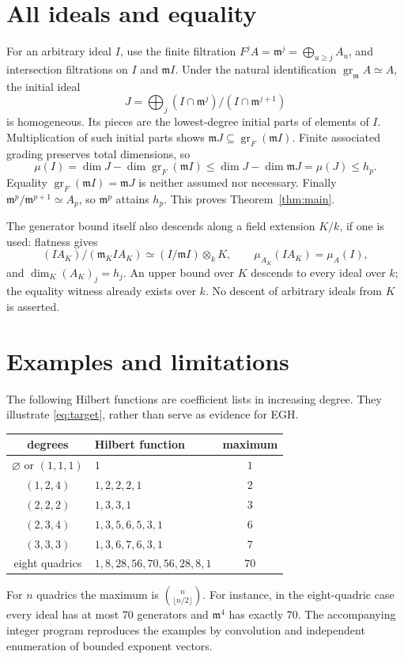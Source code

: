 \documentclass[11pt]{article}
\DeclareMathOperator{\gr}{gr}
\newcommand{\m}{\mathfrak m}
\begin{document}
\section{All ideals and equality}
For an arbitrary ideal \(I\), use the finite filtration
\(F^jA=\m^j=\bigoplus_{u\ge j}A_u\), and intersection filtrations
on \(I\) and \(\m I\). Under the natural identification
\(\gr_\m A\simeq A\), the initial ideal
\[
 J=\bigoplus_j (I\cap\m^j)/(I\cap\m^{j+1})
\]
is homogeneous. Its pieces are the lowest-degree initial parts of
elements of \(I\). Multiplication of such initial parts shows
\(\m J\subseteq\gr_F(\m I)\). Finite associated grading preserves
total dimensions, so
\[
 \mu(I)=\dim J-\dim\gr_F(\m I)
 \le\dim J-\dim\m J=\mu(J)\le h_p.
\]
Equality \(\gr_F(\m I)=\m J\) is neither assumed nor necessary.
Finally \(\m^p/\m^{p+1}\simeq A_p\), so \(\m^p\) attains \(h_p\).
This proves Theorem~\ref{thm:main}.

The generator bound itself also descends along a field extension
\(K/k\), if one is used: flatness gives
\[
 (IA_K)/(\m_KIA_K)\simeq (I/\m I)\otimes_kK,
 \qquad \mu_{A_K}(IA_K)=\mu_A(I),
\]
and \(\dim_K(A_K)_j=h_j\). An upper bound over \(K\) descends to
every ideal over \(k\); the equality witness already exists over \(k\).
No descent of arbitrary ideals from \(K\) is asserted.

\section{Examples and limitations}
The following Hilbert functions are coefficient lists in increasing degree.
They illustrate \eqref{eq:target}, rather than serve as evidence for EGH.
\begin{center}
\begin{tabular}{c|l|c}
degrees & Hilbert function & maximum\\\hline
\(\varnothing\) or \((1,1,1)\) & \(1\) & \(1\)\\
\((1,2,4)\) & \(1,2,2,2,1\) & \(2\)\\
\((2,2,2)\) & \(1,3,3,1\) & \(3\)\\
\((2,3,4)\) & \(1,3,5,6,5,3,1\) & \(6\)\\
\((3,3,3)\) & \(1,3,6,7,6,3,1\) & \(7\)\\
eight quadrics & \(1,8,28,56,70,56,28,8,1\) & \(70\)
\end{tabular}
\end{center}
For \(n\) quadrics the maximum is \(\binom n{\lfloor n/2\rfloor}\).
For instance, in the eight-quadric case every ideal has at most
\(70\) generators and \(\m^4\) has exactly \(70\).
The accompanying integer program reproduces the examples by convolution
and independent enumeration of bounded exponent vectors.
\end{document}
